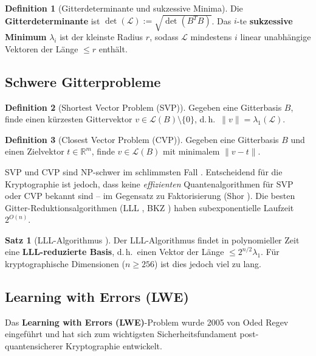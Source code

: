 ﻿\documentclass[a4paper,12pt]{scrreprt}
\theoremstyle{definition}
\newtheorem{definition}{Definition}[section]
\newtheorem{satz}{Satz}[section]
\begin{document}
\begin{definition}[Gitterdeterminante und sukzessive Minima]
Die \textbf{Gitterdeterminante} ist $\det(\mathcal{L}) := \sqrt{\det(B^T B)}$. Das $i$-te \textbf{sukzessive Minimum} $\lambda_i$ ist der kleinste Radius $r$, sodass $\mathcal{L}$ mindestens $i$ linear unabhängige Vektoren der Länge $\leq r$ enthält.
\end{definition}

\subsection{Schwere Gitterprobleme}

\begin{definition}[Shortest Vector Problem (SVP)]
Gegeben eine Gitterbasis $B$, finde einen kürzesten Gittervektor $v \in \mathcal{L}(B) \setminus \{0\}$, d.\,h.\ $\|v\| = \lambda_1(\mathcal{L})$.
\end{definition}

\begin{definition}[Closest Vector Problem (CVP)]
Gegeben eine Gitterbasis $B$ und einen Zielvektor $t \in \mathbb{R}^m$, finde $v \in \mathcal{L}(B)$ mit minimalem $\|v - t\|$.
\end{definition}

SVP und CVP sind NP-schwer im schlimmsten Fall \cite{MR09}. Entscheidend für die Kryptographie ist jedoch, dass keine \emph{effizienten} Quantenalgorithmen für SVP oder CVP bekannt sind -- im Gegensatz zu Faktorisierung (Shor \cite{Sho94}). Die besten Gitter-Reduktionsalgorith\-men (LLL \cite{LLL82}, BKZ \cite{Sch87}) haben subexponentielle Laufzeit $2^{O(n)}$.

\begin{satz}[LLL-Algorithmus \cite{LLL82}]
Der LLL-Algorithmus findet in polynomieller Zeit eine \textbf{LLL-reduzierte Basis}, d.\,h.\ einen Vektor der Länge $\leq 2^{n/2} \lambda_1$. Für kryptographische Dimensionen ($n \geq 256$) ist dies jedoch viel zu lang.
\end{satz}

\subsection{Learning with Errors (LWE)}

Das \textbf{Learning with Errors (LWE)}-Problem wurde 2005 von Oded Regev eingeführt \cite{Reg05} und hat sich zum wichtigsten Sicherheitsfundament post-quantensicherer Kryptographie entwickelt.
\end{document}
